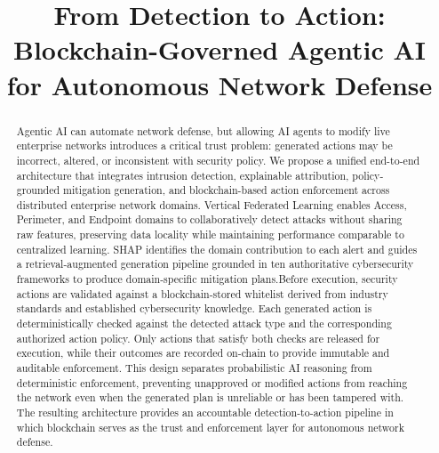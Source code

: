 \documentclass[10pt, conference]{IEEEtran}
\begin{document}
 
\title{From Detection to Action: Blockchain-Governed Agentic AI for Autonomous Network Defense}
 
\author
 {
 
 \and

 }
 
\maketitle

\begin{abstract}
Agentic AI can automate network defense, but allowing AI agents to modify live enterprise networks introduces a critical trust problem: generated actions may be incorrect, altered, or inconsistent with security policy. We propose a unified end-to-end architecture that integrates intrusion detection, explainable attribution, policy-grounded mitigation generation, and blockchain-based action enforcement across distributed enterprise network domains. Vertical Federated Learning enables Access, Perimeter, and Endpoint domains to collaboratively detect attacks without sharing raw features, preserving data locality while maintaining performance comparable to centralized learning. SHAP identifies the domain contribution to each alert and guides a retrieval-augmented generation pipeline grounded in ten authoritative cybersecurity frameworks to produce domain-specific mitigation plans.Before execution, security actions are validated against a blockchain-stored whitelist derived from industry standards and established cybersecurity knowledge. Each generated action is deterministically checked against the detected attack type and the corresponding authorized action policy. Only actions that satisfy both checks are released for execution, while their outcomes are recorded on-chain to provide immutable and auditable enforcement. This design separates probabilistic AI reasoning from deterministic enforcement, preventing unapproved or modified actions from reaching the network even when the generated plan is unreliable or has been tampered with. The resulting architecture provides an accountable detection-to-action pipeline in which blockchain serves as the trust and enforcement layer for autonomous network defense.
\end{abstract}
\end{document}
